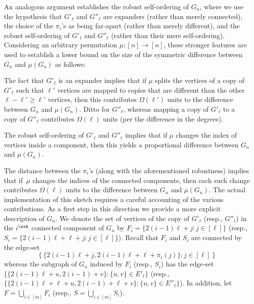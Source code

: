 An analogous argument establishes the robust self-ordering of $G_n$,
where we use the hypothesis that $G'_\ell$ and $G''_\ell$ are expanders
(rather than merely connected),
the choice of the $\pi_i$'s as being far-apart
(rather than merely different),
and the robust self-ordering of $G'_\ell$ and $G''_\ell$
(rather than their mere self-ordering).
%
Considering an arbitrary permutation $\mu:[n]\to[n]$,
these stronger features are used to establish a lower bound on the size
of the symmetric difference between $G_n$ and $\mu(G_n)$ as follows:
\BI
\item
The fact that $G'_\ell$ is an expander implies that if $\mu$ splits
the vertices of a copy of $G'_\ell$ such that $\ell'$ vertices are mapped
to copies that are different than the other $\ell-\ell'\geq\ell'$ vertices,
then this contributes $\Omega(\ell')$ units
to the difference between $G_n$ and $\mu(G_n)$.
Ditto for $G''_\ell$, whereas mapping a copy of $G'_\ell$
to a copy of $G''_\ell$ contributes $\Omega(\ell)$ units
(per the difference in the degrees).
\item
The robust self-ordering of $G'_\ell$ and $G''_\ell$ implies that
if $\mu$ changes the index of vertices inside a component,
then this yields a proportional difference between $G_n$ and $\mu(G_n)$.
\item
The distance between the $\pi_i$'s
(along with the aforementioned robustness)
implies that if~$\mu$ changes the indices of the connected components,
then each such change contributes $\Omega(\ell)$ units
to the difference between $G_n$ and $\mu(G_n)$.
\EI
The actual implementation of this sketch requires
a careful accounting of the various contributions.
As a first step in this direction we provide
a more explicit description of $G_n$.
We denote the set of vertices
of the copy of $G'_\ell$ (resp., $G''_\ell$)
in the $i^\xth$ connected component of $G_n$
by $F_i=\{2(i-1)\ell+j:j\in[\ell]\}$
(resp., $S_i=\{2(i-1)\ell+\ell+j:j\in[\ell]\}$).
Recall that $F_i$ and $S_i$ are connected by the edge-set
\begin{equation}\label{edges-of-cc:eq2}
\left\{\{2(i-1)\ell+j,2(i-1)\ell+\ell+\pi_i(j)\}:j\!\in\![\ell]\right\}
\end{equation}
whereas the subgraph of $G_n$ induced by $F_i$ (resp., $S_i$)
has the edge-set $\{\{2(i-1)\ell+u,2(i-1)+v\}:\{u,v\}\!\in\!E'_\ell\}$
(resp., $\{\{2(i-1)\ell+\ell+u,2(i-1)+\ell+v\}:\{u,v\}\!\in\!E''_\ell\}$).
In addition, let $F=\bigcup_{i\in[m]}F_i$
(resp., $S=\bigcup_{i\in[m]}S_i$).


